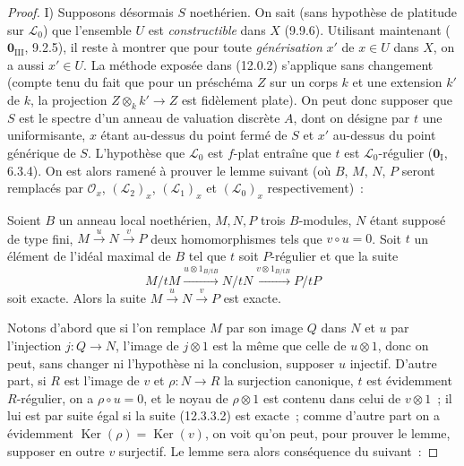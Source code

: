 \begin{proof}
\medskip
I) Supposons désormais $S$ noethérien. On sait (sans hypothèse de platitude sur
$\mathcal L_0$) que l'ensemble $U$ est \emph{constructible} dans $X$ (9.9.6).
Utilisant maintenant ($\mathbf 0_{\mathrm{III}}$, 9.2.5), il reste à montrer
que pour toute \emph{générisation} $x'$ de $x\in U$ dans $X$, on a aussi
$x'\in U$. La méthode exposée dans (12.0.2) s'applique sans changement (compte
tenu du fait que pour un préschéma $Z$ sur un corps $k$ et une extension $k'$
de $k$, la projection $Z\otimes_k k'\to Z$ est fidèlement plate). On peut donc
supposer que $S$ est le spectre d'un anneau de valuation discrète $A$, dont on
désigne par $t$ une uniformisante, $x$ étant au-dessus du point fermé de $S$ et
$x'$ au-dessus du point générique de $S$. L'hypothèse que $\mathcal L_0$ est
$f$-plat entraîne que $t$ est $\mathcal L_0$-régulier
($\mathbf 0_{\mathrm I}$, 6.3.4). On est alors ramené à prouver le lemme suivant
(où $B$, $M$, $N$, $P$ seront remplacés par $\mathcal O_x$,
$(\mathcal L_2)_x$, $(\mathcal L_1)_x$ et $(\mathcal L_0)_x$ respectivement)~:

\begin{lemma}[12.3.3.1]
\label{IV.12.3.3.1-fr}
Soient $B$ un anneau local noethérien, $M,N,P$ trois $B$-modules, $N$ étant
supposé de type fini, $M\xrightarrow{u}N\xrightarrow{v}P$ deux homomorphismes
tels que $v\circ u=0$. Soit $t$ un élément de l'idéal maximal de $B$ tel que
$t$ soit $P$-régulier et que la suite
\begin{equation}
  \tag{12.3.3.2}
  \label{IV.12.3.3.2-fr}
  M/tM\xrightarrow{u\otimes1_{B/tB}}N/tN
  \xrightarrow{v\otimes1_{B/tB}}P/tP
\end{equation}
soit exacte. Alors la suite $M\xrightarrow{u}N\xrightarrow{v}P$ est exacte.
\end{lemma}

Notons d'abord que si l'on remplace $M$ par son image $Q$ dans $N$ et $u$ par
l'injection $j:Q\to N$, l'image de $j\otimes1$ est la même que celle de
$u\otimes1$, donc on peut, sans changer ni l'hypothèse ni la conclusion,
supposer $u$ injectif. D'autre part, si $R$ est l'image de $v$ et
$\rho:N\to R$ la surjection canonique, $t$ est évidemment $R$-régulier, on a
$\rho\circ u=0$, et le noyau de $\rho\otimes1$ est contenu dans celui de
$v\otimes1$~; il lui est par suite égal si la suite (12.3.3.2) est exacte~;
comme d'autre part on a évidemment $\operatorname{Ker}(\rho)
=\operatorname{Ker}(v)$, on voit qu'on peut, pour prouver le lemme, supposer en
outre $v$ surjectif. Le lemme sera alors conséquence du suivant~:


\end{proof}
